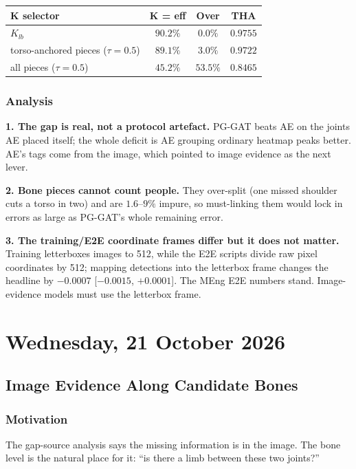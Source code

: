 \begin{tabular}{lccc}
\hline
\textbf{K selector} & \textbf{K = eff} & \textbf{Over} & \textbf{THA} \\
\hline
\textbf{$K_{lb}$}                       & $\mathbf{90.2\%}$ & $0.0\%$ & $\mathbf{0.9755}$ \\
torso-anchored pieces ($\tau = 0.5$)   & $89.1\%$ & $3.0\%$ & $0.9722$ \\
all pieces ($\tau = 0.5$)              & $45.2\%$ & $53.5\%$ & $0.8465$ \\
\hline
\end{tabular}

\subsubsection{Analysis}

\textbf{1. The gap is real, not a protocol artefact.} PG-GAT beats AE on the joints AE placed itself; the whole deficit is AE grouping ordinary heatmap peaks better. AE's tags come from the image, which pointed to image evidence as the next lever.

\textbf{2. Bone pieces cannot count people.} They over-split (one missed shoulder cuts a torso in two) and are $1.6$--$9\%$ impure, so must-linking them would lock in errors as large as PG-GAT's whole remaining error.

\textbf{3. The training/E2E coordinate frames differ but it does not matter.} Training letterboxes images to 512, while the E2E scripts divide raw pixel coordinates by 512; mapping detections into the letterbox frame changes the headline by $-0.0007$ [$-0.0015$, $+0.0001$]. The MEng E2E numbers stand. Image-evidence models must use the letterbox frame.

\section[2026/10/21]{Wednesday, 21 October 2026}

\subsection{Image Evidence Along Candidate Bones}

\subsubsection{Motivation}

The gap-source analysis says the missing information is in the image. The bone level is the natural place for it: ``is there a limb between these two joints?''

